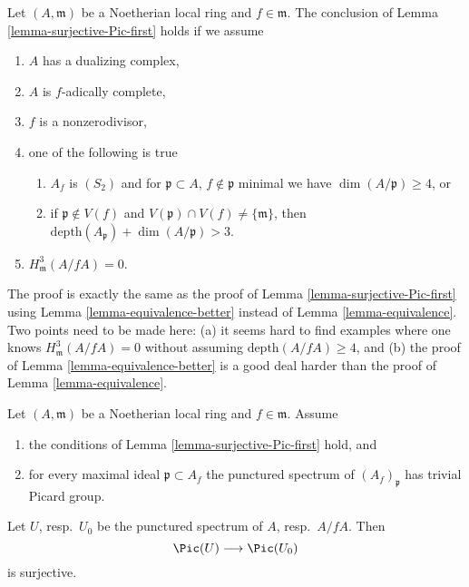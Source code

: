 \begin{remark}
\label{remark-surjective-Pic-second}
Let $(A, \mathfrak m)$ be a Noetherian local ring and $f \in \mathfrak m$.
The conclusion of Lemma \ref{lemma-surjective-Pic-first} holds if we assume
\begin{enumerate}
\item $A$ has a dualizing complex,
\item $A$ is $f$-adically complete,
\item $f$ is a nonzerodivisor,
\item one of the following is true
\begin{enumerate}
\item $A_f$ is $(S_2)$ and for $\mathfrak p \subset A$,
$f \not \in \mathfrak p$ minimal we have $\dim(A/\mathfrak p) \geq 4$, or
\item if $\mathfrak p \not \in V(f)$ and
$V(\mathfrak p) \cap V(f) \not = \{\mathfrak m\}$, then
$\text{depth}(A_\mathfrak p) + \dim(A/\mathfrak p) > 3$.
\end{enumerate}
\item $H^3_{\mathfrak m}(A/fA) = 0$.
\end{enumerate}
The proof is exactly the same as the proof of
Lemma \ref{lemma-surjective-Pic-first}
using Lemma \ref{lemma-equivalence-better} instead of
Lemma \ref{lemma-equivalence}.
Two points need to be made here: (a)
it seems hard to find examples where one knows
$H^3_{\mathfrak m}(A/fA) = 0$ without assuming
$\text{depth}(A/fA) \geq 4$, and
(b) the proof of Lemma \ref{lemma-equivalence-better} is a
good deal harder than the proof of Lemma \ref{lemma-equivalence}.
\end{remark}

\begin{lemma}
\label{lemma-surjective-Pic-first-better}
Let $(A, \mathfrak m)$ be a Noetherian local ring and $f \in \mathfrak m$.
Assume
\begin{enumerate}
\item the conditions of Lemma \ref{lemma-surjective-Pic-first} hold, and
\item for every maximal ideal $\mathfrak p \subset A_f$
the punctured spectrum of $(A_f)_\mathfrak p$ has trivial Picard group.
\end{enumerate}
Let $U$, resp.\ $U_0$ be the punctured spectrum of $A$, resp.\ $A/fA$.
Then
$$
\Pic(U) \longrightarrow \Pic(U_0)
$$
is surjective.
\end{lemma}

